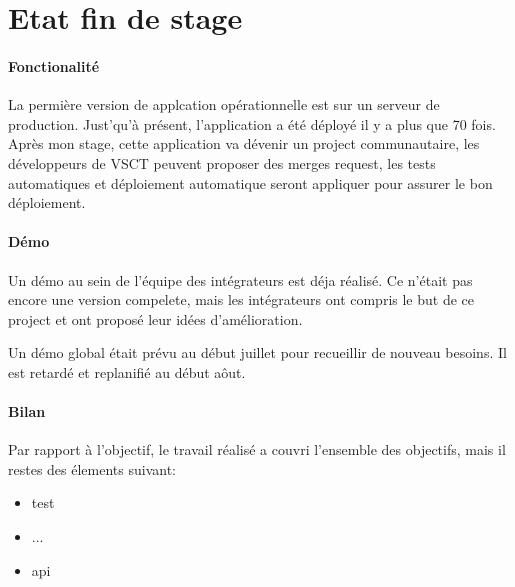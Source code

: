 \section{Etat fin de stage}

\paragraph{Fonctionalité}
La permière version de applcation opérationnelle est sur un serveur de production.
Just'qu'à présent, l'application a été déployé il y a plus que 70 fois.
Après mon stage, cette application va dévenir un project communautaire,
les développeurs de VSCT peuvent proposer des merges request,
les tests automatiques et déploiement automatique seront appliquer pour assurer le bon déploiement.

\paragraph{Démo}
Un démo au sein de l'équipe des intégrateurs est déja réalisé.
Ce n'était pas encore une version compelete, mais les intégrateurs ont compris le but de ce project et ont proposé leur idées d'amélioration.

Un démo global était prévu au début juillet pour recueillir de nouveau besoins. Il est retardé et replanifié au début aôut.

\paragraph{Bilan}
Par rapport à l'objectif, le travail réalisé a couvri l'ensemble des objectifs, mais il restes des élements suivant:
\begin{itemize}
  \item test
  \item ...
  \item api
\end{itemize}

\clearpage
